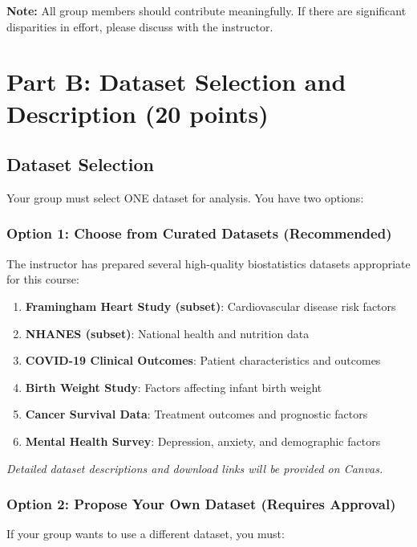 \documentclass[11pt]{article}
\begin{document}
\textbf{Note:} All group members should contribute meaningfully. If there are significant disparities in effort, please discuss with the instructor.

\newpage

\section{Part B: Dataset Selection and Description (20 points)}

\subsection{Dataset Selection}

Your group must select ONE dataset for analysis. You have two options:

\subsubsection{Option 1: Choose from Curated Datasets (Recommended)}

The instructor has prepared several high-quality biostatistics datasets appropriate for this course:

\begin{enumerate}
\item \textbf{Framingham Heart Study (subset)}: Cardiovascular disease risk factors
\item \textbf{NHANES (subset)}: National health and nutrition data
\item \textbf{COVID-19 Clinical Outcomes}: Patient characteristics and outcomes
\item \textbf{Birth Weight Study}: Factors affecting infant birth weight
\item \textbf{Cancer Survival Data}: Treatment outcomes and prognostic factors
\item \textbf{Mental Health Survey}: Depression, anxiety, and demographic factors
\end{enumerate}

\textit{Detailed dataset descriptions and download links will be provided on Canvas.}

\subsubsection{Option 2: Propose Your Own Dataset (Requires Approval)}

If your group wants to use a different dataset, you must:
\end{document}
